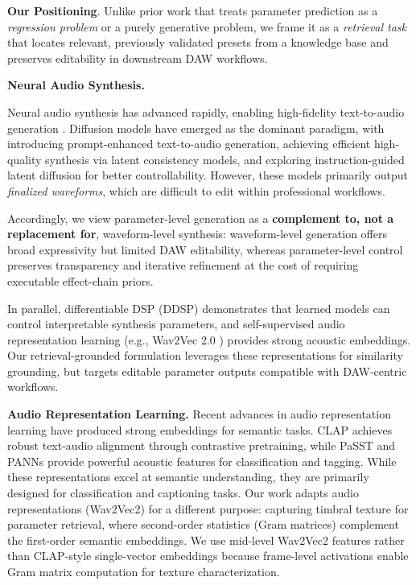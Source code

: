 \textbf{Our Positioning}. Unlike prior work that treats parameter prediction as a \textit{regression problem} or a purely generative problem, we frame it as a \textit{retrieval task} that locates relevant, previously validated presets from a knowledge base and preserves editability in downstream DAW workflows.

\noindent\textbf{Neural Audio Synthesis.}

Neural audio synthesis has advanced rapidly, enabling high-fidelity text-to-audio generation \citep{liu2023audioldm,liu2024audioldm2,agostinelli2023musiclm,vyas2023audiobox}. Diffusion models have emerged as the dominant paradigm, with \citet{huang2022makeanaudio} introducing prompt-enhanced text-to-audio generation, \citet{wang2023audiolcm} achieving efficient high-quality synthesis via latent consistency models, and \citet{liang2024instruction} exploring instruction-guided latent diffusion for better controllability. However, these models primarily output \textit{finalized waveforms}, which are difficult to edit within professional workflows.

Accordingly, we view parameter-level generation as a \textbf{complement to, not a replacement for}, waveform-level synthesis: waveform-level generation offers broad expressivity but limited DAW editability, whereas parameter-level control preserves transparency and iterative refinement at the cost of requiring executable effect-chain priors.

In parallel, differentiable DSP (DDSP) \citep{engel2020ddsp} demonstrates that learned models can control interpretable synthesis parameters, and self-supervised audio representation learning (e.g., Wav2Vec 2.0 \citep{baevski2020wav2vec}) provides strong acoustic embeddings. Our retrieval-grounded formulation leverages these representations for similarity grounding, but targets editable parameter outputs compatible with DAW-centric workflows.

\noindent\textbf{Audio Representation Learning.}
Recent advances in audio representation learning have produced strong embeddings for semantic tasks. CLAP \citep{elizalde2023clap} achieves robust text-audio alignment through contrastive pretraining, while PaSST \citep{koutini2022passt} and PANNs \citep{kong2020panns} provide powerful acoustic features for classification and tagging. While these representations excel at semantic understanding, they are primarily designed for classification and captioning tasks. Our work adapts audio representations (Wav2Vec2) for a different purpose: capturing timbral texture for parameter retrieval, where second-order statistics (Gram matrices) complement the first-order semantic embeddings. We use mid-level Wav2Vec2 features rather than CLAP-style single-vector embeddings because frame-level activations enable Gram matrix computation for texture characterization.

